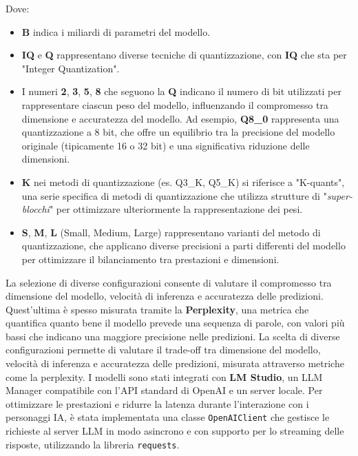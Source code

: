 Dove:
\begin{itemize}
    \item
    \textbf{B} indica i miliardi di parametri del modello.
    \item
    \textbf{IQ} e \textbf{Q} rappresentano diverse tecniche di quantizzazione, con \textbf{IQ} che sta per "Integer Quantization".
    \item
    I numeri \textbf{2}, \textbf{3}, \textbf{5}, \textbf{8} che seguono la \textbf{Q} indicano il numero di bit utilizzati per rappresentare ciascun peso del modello, influenzando il compromesso tra dimensione e accuratezza del modello. Ad esempio, \textbf{Q8\_0} rappresenta una quantizzazione a 8 bit, che offre un equilibrio tra la precisione del modello originale (tipicamente 16 o 32 bit) e una significativa riduzione delle dimensioni.
    \item
    \textbf{K} nei metodi di quantizzazione (es. Q3\_K, Q5\_K) si riferisce a "K-quants"\cite{kquants}, una serie specifica di metodi di quantizzazione che utilizza strutture di "\textit{super-blocchi}" per ottimizzare ulteriormente la rappresentazione dei pesi.
    \item 
    \textbf{S}, \textbf{M}, \textbf{L} (Small, Medium, Large) rappresentano varianti del metodo di quantizzazione, che applicano diverse precisioni a parti differenti del modello per ottimizzare il bilanciamento tra prestazioni e dimensioni.

\end{itemize}
La selezione di diverse configurazioni consente di valutare il compromesso tra dimensione del modello, velocità di inferenza e accuratezza delle predizioni. Quest'ultima è spesso misurata tramite la \textbf{Perplexity}\cite{bernstein2021perplexity}, una metrica che quantifica quanto bene il modello prevede una sequenza di parole, con valori più bassi che indicano una maggiore precisione nelle predizioni.
La scelta di diverse configurazioni permette di valutare il trade-off tra dimensione del modello, velocità di inferenza e accuratezza delle predizioni, misurata attraverso metriche come la perplexity.
I modelli sono stati integrati con \textbf{LM Studio}, un LLM Manager compatibile con l'API standard di OpenAI e un server locale.
Per ottimizzare le prestazioni e ridurre la latenza durante l'interazione con i personaggi IA, è stata implementata una classe \texttt{OpenAIClient} che gestisce le richieste al server LLM in modo asincrono e con supporto per lo streaming delle risposte, utilizzando la libreria \texttt{requests}.\\\\
